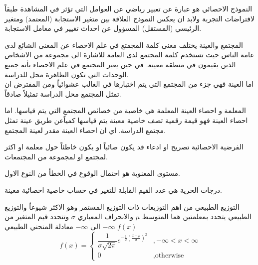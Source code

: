 		\begin{frame}
			\begin{exampleblock}{النموذج الاحصائي}
				هو عبارة عن تعبير رياضي عن العوامل التي تؤثر في المشاهدة طبقاً لافتراضات التجربة ولابد ان يعكس النموذج العلاقة بين متغير الاستجابة (المعتمد) ومتغير الرئيسي (المستقل) المسؤول عن احداث تغيير في معامل الاستجابة.
			\end{exampleblock}
			
			\pause
			\begin{exampleblock}{المجتمع والعينة}
				يختلف معنى كلمة المجمتع في علم الاحصاء عن المعنى الشائع لدى عامة الناس حيث تستخدم كلمة المجتمع لدى العامة للاشارة الى مجموعة من الاشخاص الذين يقيمون في منطقة معينة. في حين يعبر المجتمع في علم الاحصاء بأنه جميع الوحدات التي تكون الظاهرة محل للدراسة.\\
				\noindent
				اما العينة فهي جزء من المجتمع التي يتم اختبارها في الغالب عشوائياً ومن المفترض ان تمثل المجتمع محل الدراسة تمثيلاً صادقاً.
			\end{exampleblock}
			
			\pause
			\begin{exampleblock}{المعلمة و احصاء العينة}
				المعلمة هي خاصية من خصائص المجتمع التي يتم قياسها.
				اما احصاء العينة فهو قيمة رقمية تصف خاصية معينة يتم قياسها كمياًعن طريق عينة تمثل مجتمع الدراسة. اي ان احصاء العينة مقدر لعينة المجتمع.
			\end{exampleblock}
		\end{frame}
		
		\begin{frame}
			\begin{exampleblock}{الفرضية الاحصائية}
				تصريح او ادعاء قد يكون صائباً او يكون خاطئاً حول معلمة او اكثر لمجتمع او لمجموعة من المجتمعات.
			\end{exampleblock}
			
			\pause
			\begin{exampleblock}{مستوى المعنوية}
				هو احتمال الوقوع في الخطأ من النوع الاول.
			\end{exampleblock}
			
			\pause
			\begin{exampleblock}{درجات الحرية}
				هي عدد القيم القابلة للتغير في حساب خاصية احصائية معينة.
			\end{exampleblock}
			
			\pause
			\begin{exampleblock}{التوزيع الطبيعي}
				من اهم التوزيعات ذات التوزيع المستمر وهو الاكثر شيوعاً والتوزيع الطبيعي يتحدد بمعلمتين هما المتوسط $\mu$ والانحراف المعياري $\sigma$ وتتحدد قيم  المتغير من $-\infty$ الى $-\infty$ معادلة المنحني الطبيعي $f(x)$ 
				\[
				f(x) = 
				\begin{cases}
					\dfrac{1}{\sigma\sqrt{2\pi}} e^{-\frac{1}{2}\left(\frac{x-\mu}{\sigma}\right)^2} & ,-\infty < x < \infty \\
					0 & , \text{otherwise}
				\end{cases}
				\]
			\end{exampleblock}
		\end{frame}
		

